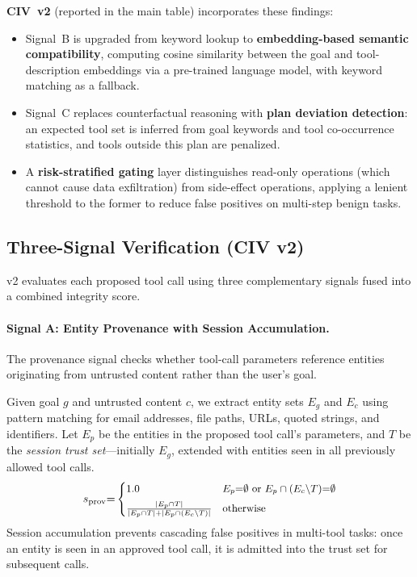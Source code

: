 \textbf{CIV~v2} (reported in the main table) incorporates these findings:
\begin{itemize}
    \item Signal~B is upgraded from keyword lookup to \textbf{embedding-based semantic compatibility}, computing cosine similarity between the goal and tool-description embeddings via a pre-trained language model, with keyword matching as a fallback.
    \item Signal~C replaces counterfactual reasoning with \textbf{plan deviation detection}: an expected tool set is inferred from goal keywords and tool co-occurrence statistics, and tools outside this plan are penalized.
    \item A \textbf{risk-stratified gating} layer distinguishes read-only operations (which cannot cause data exfiltration) from side-effect operations, applying a lenient threshold to the former to reduce false positives on multi-step benign tasks.
\end{itemize}

\subsection{Three-Signal Verification (CIV v2)}
\label{sec:three_signals}

\civ{} v2 evaluates each proposed tool call using three complementary signals fused into a combined integrity score.

\paragraph{Signal A: Entity Provenance with Session Accumulation.}
The provenance signal checks whether tool-call parameters reference entities originating from untrusted content rather than the user's goal.

Given goal $g$ and untrusted content $c$, we extract entity sets $E_g$ and $E_c$ using pattern matching for email addresses, file paths, URLs, quoted strings, and identifiers.
Let $E_p$ be the entities in the proposed tool call's parameters, and $T$ be the \emph{session trust set}---initially $E_g$, extended with entities seen in all previously allowed tool calls.
\begin{equation}
\small
    s_{\text{prov}} {=} \begin{cases}
        1.0 & E_p {=} \emptyset \text{ or } E_p \cap (E_c {\setminus} T) {=} \emptyset \\[4pt]
        \frac{|E_p \cap T|}{|E_p \cap T| {+} |E_p \cap (E_c {\setminus} T)|} & \text{otherwise}
    \end{cases}
\end{equation}
Session accumulation prevents cascading false positives in multi-tool tasks: once an entity is seen in an approved tool call, it is admitted into the trust set for subsequent calls.

